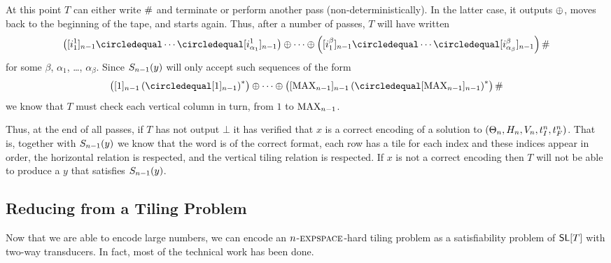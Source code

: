 \begin{itemize}
    At this point $T$ can either write $\#$ and terminate or perform another pass (non-deterministically).
    In the latter case, it outputs $\oplus$, moves back to the beginning of the tape, and starts again.
    Thus, after a number of passes, $T$ will have written
    \[
        \brac{
            \tenc{\expheight-1}{i^1_1}
            \numeq
            \cdots
            \numeq
            \tenc{\expheight-1}{i^1_{\alpha_1}}
        }
        \numplus
        \cdots
        \numplus
        \brac{
            \tenc{\expheight-1}{i^\beta_1}
            \numeq
            \cdots
            \numeq
            \tenc{\expheight-1}{i^\beta_{\alpha_\beta}}
        }
        \numsep
    \]
    for some $\beta$, $\alpha_1$, \ldots, $\alpha_\beta$.
    Since
    ${S_{n-1}}\mathord{\left( y \right)}$
    will only accept such sequences of the form
    \[
        \brac{
            \tenc{\expheight-1}{1}
            \brac{
                \numeq \tenc{\expheight-1}{1}
            }^\ast
        }
        \numplus
        \cdots
        \numplus
        \brac{
            \tenc{\expheight-1}{\nmax{\expheight-1}}
            \brac{
                \numeq \tenc{\expheight-1}{\nmax{\expheight-1}}
            }^\ast
        }
        \numsep
    \]
    we know that $T$ must check each vertical column in turn, from $1$ to
    $\text{MAX}_{n-1}$.
\end{itemize}

Thus, at the end of all passes, if $T$ has not output $\bot$ it has verified that $x$ is a correct encoding of a solution to
$\left( \Theta_{n},
      H_{n},
      V_{n},
      t_I^{n},
      t_F^{n} \right)$.
That is, together with
${S_{n-1}}\mathord{\left( y \right)}$
we know that
    the word is of the correct format,
    each row has a tile for each index and these indices appear in order,
    the horizontal relation is respected, and
    the vertical tiling relation is respected.
If $x$ is not a correct encoding then $T$ will not be able to produce a $y$ that satisfies
${S_{n-1}}\mathord{\left( y \right)}$.


\subsection{Reducing from a Tiling Problem}

Now that we are able to encode large numbers, we can encode an $n$-$\textsc{expspace}$-hard tiling problem as a satisfiability problem of $\mathsf{SL}[T]$ with two-way transducers.
In fact, most of the technical work has been done.

